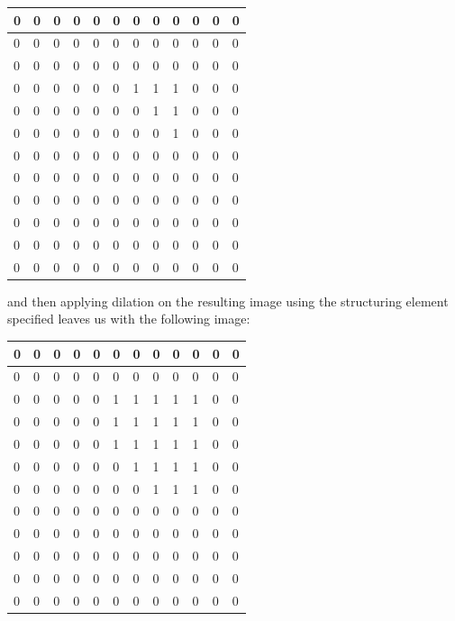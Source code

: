 \documentclass[12pt, letterpaper]{article}
\begin{document}
\begin{table}[H]
    \centering
    \begin{tabular}{|l|l|l|l|l|l|l|l|l|l|l|l|}
    \hline
     0 & 0 & 0 & 0 & 0 & 0 & 0 & 0 & 0 & 0 & 0 & 0 \\ \hline
     0 & 0 & 0 & 0 & 0 & 0 & 0 & 0 & 0 & 0 & 0 & 0 \\ \hline
     0 & 0 & 0 & 0 & 0 & 0 & 0 & 0 & 0 & 0 & 0 & 0 \\ \hline
     0 & 0 & 0 & 0 & 0 & 0 & 1 & 1 & 1 & 0 & 0 & 0 \\ \hline
     0 & 0 & 0 & 0 & 0 & 0 & 0 & 1 & 1 & 0 & 0 & 0 \\ \hline
     0 & 0 & 0 & 0 & 0 & 0 & 0 & 0 & 1 & 0 & 0 & 0 \\ \hline
     0 & 0 & 0 & 0 & 0 & 0 & 0 & 0 & 0 & 0 & 0 & 0 \\ \hline
     0 & 0 & 0 & 0 & 0 & 0 & 0 & 0 & 0 & 0 & 0 & 0 \\ \hline
     0 & 0 & 0 & 0 & 0 & 0 & 0 & 0 & 0 & 0 & 0 & 0 \\ \hline
     0 & 0 & 0 & 0 & 0 & 0 & 0 & 0 & 0 & 0 & 0 & 0 \\ \hline
     0 & 0 & 0 & 0 & 0 & 0 & 0 & 0 & 0 & 0 & 0 & 0 \\ \hline
     0 & 0 & 0 & 0 & 0 & 0 & 0 & 0 & 0 & 0 & 0 & 0 \\ \hline
    \end{tabular}
\end{table}

and then applying dilation on the resulting image using the structuring element specified leaves us with the following image:



\begin{table}[H]
    \centering
    \begin{tabular}{|l|l|l|l|l|l|l|l|l|l|l|l|}
    \hline
     0 & 0 & 0 & 0 & 0 & 0 & 0 & 0 & 0 & 0 & 0 & 0 \\ \hline
     0 & 0 & 0 & 0 & 0 & 0 & 0 & 0 & 0 & 0 & 0 & 0 \\ \hline
     0 & 0 & 0 & 0 & 0 & 1 & 1 & 1 & 1 & 1 & 0 & 0 \\ \hline
     0 & 0 & 0 & 0 & 0 & 1 & 1 & 1 & 1 & 1 & 0 & 0 \\ \hline
     0 & 0 & 0 & 0 & 0 & 1 & 1 & 1 & 1 & 1 & 0 & 0 \\ \hline
     0 & 0 & 0 & 0 & 0 & 0 & 1 & 1 & 1 & 1 & 0 & 0 \\ \hline
     0 & 0 & 0 & 0 & 0 & 0 & 0 & 1 & 1 & 1 & 0 & 0 \\ \hline
     0 & 0 & 0 & 0 & 0 & 0 & 0 & 0 & 0 & 0 & 0 & 0 \\ \hline
     0 & 0 & 0 & 0 & 0 & 0 & 0 & 0 & 0 & 0 & 0 & 0 \\ \hline
     0 & 0 & 0 & 0 & 0 & 0 & 0 & 0 & 0 & 0 & 0 & 0 \\ \hline
     0 & 0 & 0 & 0 & 0 & 0 & 0 & 0 & 0 & 0 & 0 & 0 \\ \hline
     0 & 0 & 0 & 0 & 0 & 0 & 0 & 0 & 0 & 0 & 0 & 0 \\ \hline
    \end{tabular}
\end{table}
\end{document}
